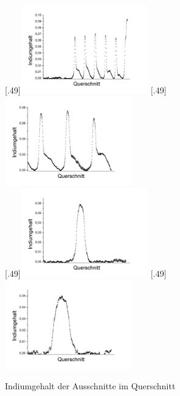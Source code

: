\documentclass[a4paper,11pt,DIV=11]{scrartcl}
\begin{document}
\begin{figure}[htb]\centering
	[.49\linewidth]{\includegraphics[width=0.49\textwidth]{Versuchsdaten/11/34000xausschnitt.png}}
	[.49\linewidth]{\includegraphics[width=0.49\textwidth]{Versuchsdaten/11/87000xausschnitt.png}}\\
	[.49\linewidth]{\includegraphics[width=0.49\textwidth]{Versuchsdaten/11/185000xausschnitt.png}}
	[.49\linewidth]{\includegraphics[width=0.49\textwidth]{Versuchsdaten/11/380000xausschnitt.png}}

	\caption{Indiumgehalt der Ausschnitte im Querschnitt} \label{indprofil}
\end{figure}
\end{document}
